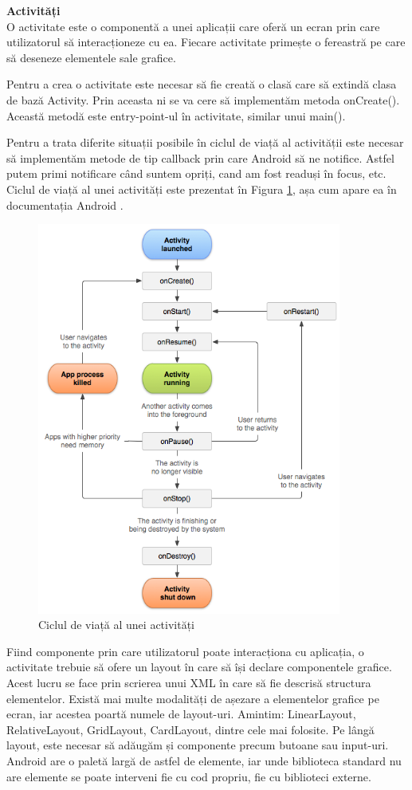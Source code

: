 \documentclass[12pt, a4paper, oneside]{article}
\begin{document}
\textbf{Activități}\\
O activitate este o componentă a unei aplicații care oferă un ecran prin care utilizatorul să interacționeze cu ea. Fiecare activitate primește o fereastră pe care să deseneze elementele sale grafice.

Pentru a crea o activitate este necesar să fie creată o clasă care să extindă clasa de bază Activity. Prin aceasta ni se va cere să implementăm metoda onCreate(). Această metodă este entry-point-ul în activitate, similar unui main().

Pentru a trata diferite situații posibile în ciclul de viață al activității este necesar să implementăm metode de tip callback prin care Android să ne notifice. Astfel putem primi notificare când suntem opriți, cand am fost readuși în focus, etc. Ciclul de viață al unei activități este prezentat în Figura \ref{fig:activity_lifecycle}, așa cum apare ea în documentația Android \cite{DeveloperAndroid}.

\begin{figure}[h]
\centering
\includegraphics[width=10cm]{figures/activity_lifecycle.png}
\caption{Ciclul de viață al unei activități}
\label{fig:activity_lifecycle}
\end{figure}

Fiind componente prin care utilizatorul poate interacționa cu aplicația, o activitate trebuie să ofere un layout în care să își declare componentele grafice. Acest lucru se face prin scrierea unui XML în care să fie descrisă structura elementelor. Există mai multe modalități de așezare a elementelor grafice pe ecran, iar acestea poartă numele de layout-uri. Amintim: LinearLayout, RelativeLayout, GridLayout, CardLayout, dintre cele mai folosite. Pe lângă layout, este necesar să adăugăm și componente precum butoane sau input-uri. Android are o paletă largă de astfel de elemente, iar unde biblioteca standard nu are elemente se poate interveni fie cu cod propriu, fie cu biblioteci externe.
\end{document}
